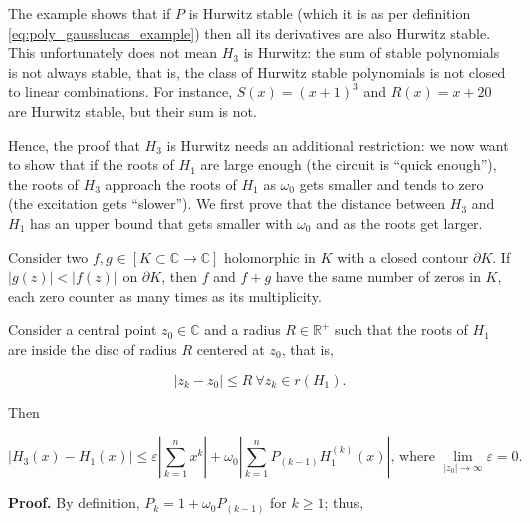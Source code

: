 	The example shows that if $P$ is Hurwitz stable (which it is as per definition \ref{eq:poly_gausslucas_example}) then all its derivatives are also Hurwitz stable. This unfortunately does not mean $H_3$ is Hurwitz: the sum of stable polynomials is not always stable, that is, the class of Hurwitz stable polynomials is not closed to linear combinations. For instance, $S(x) = (x+1)^3$ and $R(x) = x + 20$ are Hurwitz stable, but their sum is not.

	Hence, the proof that $H_3$ is Hurwitz needs an additional restriction: we now want to show that if the roots of $H_1$ are large enough (the circuit is ``quick enough''), the roots of $H_3$ approach the roots of $H_1$ as $\omega_0$ gets smaller and tends to zero (the excitation gets ``slower''). We first prove that the distance between $H_3$ and $H_1$ has an upper bound that gets smaller with $\omega_0$ and as the roots get larger.

\begin{lemma} Consider two $f,g\in\left[K\subset\mathbb{C}\to\mathbb{C}\right]$ holomorphic in $K$ with a closed contour $\partial K$. If $\left\lvert g(z)\right\rvert < \left\lvert f(z)\right\rvert$ on $\partial K$, then $f$ and $f+g$ have the same number of zeros in $K$, each zero counter as many times as its multiplicity.
\end{lemma}
\begin{theorem}\label{theo:h3approachesh1} %
	Consider a central point $z_0\in\mathbb{C}$ and a radius $R\in\mathbb{R}^+$ such that the roots of $H_1$ are inside the disc of radius $R$ centered at $z_0$, that is,

\begin{equation} \left\lvert z_k - z_0\right\rvert \leq R\ \forall z_k\in r\left(H_1\right). \end{equation}

	Then 

\begin{equation} \left\lvert H_3(x) - H_1(x)\right\rvert \leq \varepsilon\left\lvert\sum_{k=1}^n x^k\right\rvert + \omega_0 \left\lvert \sum_{k=1}^n P_{(k-1)}H_1^{(k)}(x)\right\rvert \text{, where } \lim\limits_{\left\lvert z_0\right\rvert\to\infty} \varepsilon = 0.  \end{equation}

\end{theorem}
\textbf{Proof.} By definition, $P_k = 1 + \omega_0 P_{(k-1)}$ for $k \geq 1$; thus,

